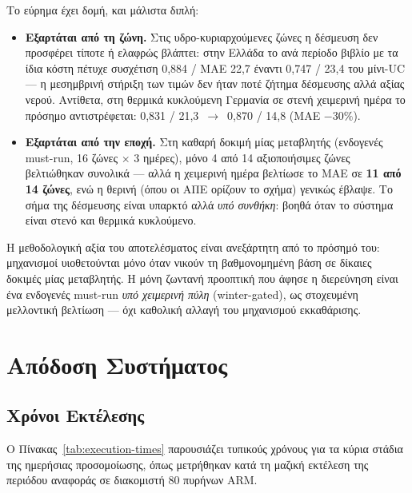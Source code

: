 Το εύρημα έχει δομή, και μάλιστα διπλή:

\begin{itemize}
\item \textbf{Εξαρτάται από τη ζώνη.} Στις υδρο-κυριαρχούμενες ζώνες η δέσμευση δεν προσφέρει τίποτε ή ελαφρώς βλάπτει: στην Ελλάδα το ανά περίοδο βιβλίο με τα ίδια κόστη πέτυχε συσχέτιση 0,884 / MAE 22,7 έναντι 0,747 / 23,4 του μίνι-UC --- η μεσημβρινή στήριξη των τιμών δεν ήταν ποτέ ζήτημα δέσμευσης αλλά αξίας νερού. Αντίθετα, στη θερμικά κυκλούμενη Γερμανία σε στενή χειμερινή ημέρα το πρόσημο αντιστρέφεται: 0,831 / 21,3~$\to$~0,870 / 14,8 (MAE $-30\%$).
\item \textbf{Εξαρτάται από την εποχή.} Στη καθαρή δοκιμή μίας μεταβλητής (ενδογενές must-run, 16 ζώνες $\times$ 3 ημέρες), μόνο 4 από 14 αξιοποιήσιμες ζώνες βελτιώθηκαν συνολικά --- αλλά η χειμερινή ημέρα βελτίωσε το MAE σε \textbf{11 από 14 ζώνες}, ενώ η θερινή (όπου οι ΑΠΕ ορίζουν το σχήμα) γενικώς έβλαψε. Το σήμα της δέσμευσης είναι υπαρκτό αλλά \emph{υπό συνθήκη}: βοηθά όταν το σύστημα είναι στενό και θερμικά κυκλούμενο.
\end{itemize}

Η μεθοδολογική αξία του αποτελέσματος είναι ανεξάρτητη από το πρόσημό του: μηχανισμοί υιοθετούνται μόνο όταν νικούν τη βαθμονομημένη βάση σε δίκαιες δοκιμές μίας μεταβλητής. Η μόνη ζωντανή προοπτική που άφησε η διερεύνηση είναι ένα ενδογενές must-run \emph{υπό χειμερινή πύλη} (winter-gated), ως στοχευμένη μελλοντική βελτίωση --- όχι καθολική αλλαγή του μηχανισμού εκκαθάρισης.


\section{Απόδοση Συστήματος}
\label{sec:system-performance}

\subsection{Χρόνοι Εκτέλεσης}
\label{subsec:execution-times}

Ο Πίνακας~\ref{tab:execution-times} παρουσιάζει τυπικούς χρόνους για τα κύρια στάδια της ημερήσιας προσομοίωσης, όπως μετρήθηκαν κατά τη μαζική εκτέλεση της περιόδου αναφοράς σε διακομιστή 80 πυρήνων ARM.

